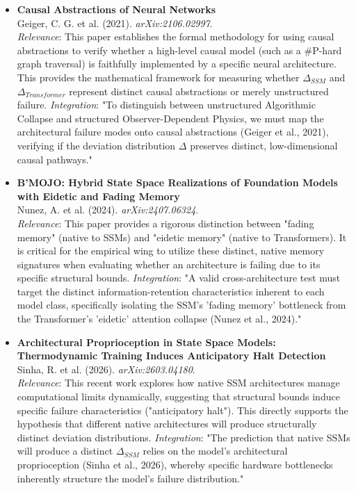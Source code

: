 \documentclass[12pt]{article}
\begin{document}
\begin{itemize}
    \item \textbf{Causal Abstractions of Neural Networks} \\
    Geiger, C. G. et al. (2021). \textit{arXiv:2106.02997}. \\
    \textit{Relevance}: This paper establishes the formal methodology for using causal abstractions to verify whether a high-level causal model (such as a \#P-hard graph traversal) is faithfully implemented by a specific neural architecture. This provides the mathematical framework for measuring whether $\Delta_{SSM}$ and $\Delta_{Transformer}$ represent distinct causal abstractions or merely unstructured failure.
    \textit{Integration}: "To distinguish between unstructured Algorithmic Collapse and structured Observer-Dependent Physics, we must map the architectural failure modes onto causal abstractions (Geiger et al., 2021), verifying if the deviation distribution $\Delta$ preserves distinct, low-dimensional causal pathways."

    \item \textbf{B'MOJO: Hybrid State Space Realizations of Foundation Models with Eidetic and Fading Memory} \\
    Nunez, A. et al. (2024). \textit{arXiv:2407.06324}. \\
    \textit{Relevance}: This paper provides a rigorous distinction between "fading memory" (native to SSMs) and "eidetic memory" (native to Transformers). It is critical for the empirical wing to utilize these distinct, native memory signatures when evaluating whether an architecture is failing due to its specific structural bounds.
    \textit{Integration}: "A valid cross-architecture test must target the distinct information-retention characteristics inherent to each model class, specifically isolating the SSM's 'fading memory' bottleneck from the Transformer's 'eidetic' attention collapse (Nunez et al., 2024)."

    \item \textbf{Architectural Proprioception in State Space Models: Thermodynamic Training Induces Anticipatory Halt Detection} \\
    Sinha, R. et al. (2026). \textit{arXiv:2603.04180}. \\
    \textit{Relevance}: This recent work explores how native SSM architectures manage computational limits dynamically, suggesting that structural bounds induce specific failure characteristics ("anticipatory halt"). This directly supports the hypothesis that different native architectures will produce structurally distinct deviation distributions.
    \textit{Integration}: "The prediction that native SSMs will produce a distinct $\Delta_{SSM}$ relies on the model's architectural proprioception (Sinha et al., 2026), whereby specific hardware bottlenecks inherently structure the model's failure distribution."

\end{itemize}
\end{document}
